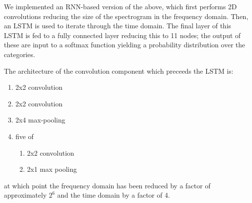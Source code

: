 We implemented an RNN-based version of the above, which first performs 2D convolutions reducing the size of the spectrogram in the frequency domain. Then, an LSTM is used to iterate through the time domain. The final layer of this LSTM is fed to a fully connected layer reducing this to 11 nodes; the output of these are input to a softmax function yielding a probability distribution over the categories.

The architecture of the convolution component which preceeds the LSTM is:

\begin{enumerate}
\item 2x2 convolution
\item 2x2 convolution
\item 2x4 max-pooling
\item five of
\begin{enumerate}
\item 2x2 convolution
\item 2x1 max pooling
\end{enumerate}
\end{enumerate}

at which point the frequency domain has been reduced by a factor of approximately $2^6$ and the time domain by a factor of 4.